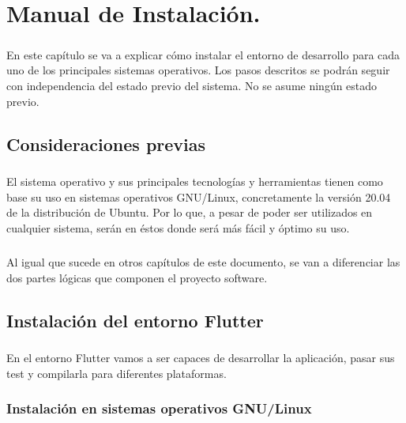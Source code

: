 \chapter{Manual de Instalación.}\label{sec:ManualDeInstalacion}

\paragraph{}En este capítulo se va a explicar cómo instalar el entorno de desarrollo
para cada uno de los principales sistemas operativos. Los pasos descritos se podrán
seguir con independencia del estado previo del sistema. No se asume ningún estado previo.

\section{Consideraciones previas}

\paragraph{}El sistema operativo y sus principales tecnologías y herramientas tienen
como base su uso en sistemas operativos GNU/Linux, concretamente la versión 20.04 de
la distribución de Ubuntu. Por lo que, a pesar de poder ser utilizados en cualquier
sistema, serán en éstos donde será más fácil y óptimo su uso.

\paragraph{} Al igual que sucede en otros capítulos de este documento, se van a diferenciar
 las dos partes lógicas que componen el proyecto software.

\section{Instalación del entorno Flutter}

\paragraph{}En el entorno Flutter vamos a ser capaces de desarrollar la aplicación,
pasar sus test y compilarla para diferentes plataformas.

\subsection{Instalación en sistemas operativos GNU/Linux}

